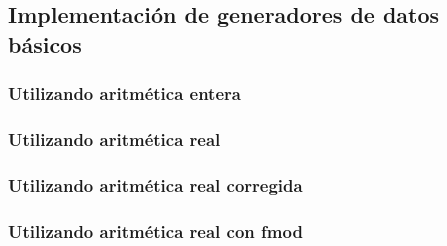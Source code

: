 \documentclass[12pt, spanish]{article}
\begin{document}
\subsection{Implementación de generadores de datos básicos}

\subsubsection{Utilizando aritmética entera}


\subsubsection{Utilizando aritmética real}


\subsubsection{Utilizando aritmética real corregida}



\subsubsection{Utilizando aritmética real con fmod}

%
%
\end{document}
